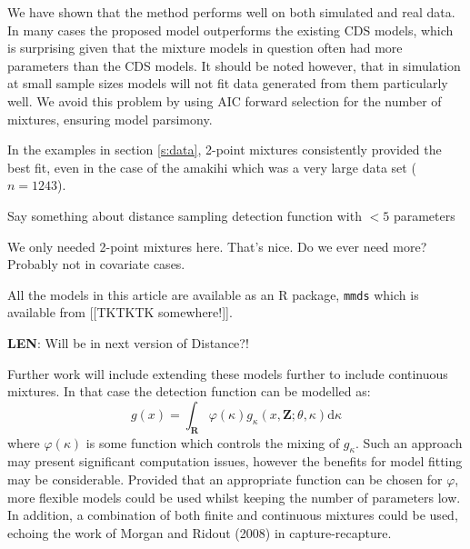 \documentclass[useAMS,referee, usegraphicx]{biom}
\begin{document}
We have shown that the method performs well on both simulated and real data. In many cases the proposed model outperforms the existing CDS models, which is surprising given that the mixture models in question often had more parameters than the CDS models. It should be noted however, that in simulation at small sample sizes models will not fit data generated from them particularly well. We avoid this problem by using AIC forward selection for the number of mixtures, ensuring model parsimony.

In the examples in section \ref{s:data}, 2-point mixtures consistently provided the best fit, even in the case of the amakihi which was a very large data set ($n=1243$). 

Say something about distance sampling detection function with $<5$ parameters


We only needed 2-point mixtures here. That's nice. Do we ever need more? Probably not in covariate cases.

All the models in this article are available as an \textsf{R} package, \texttt{mmds} which is available from [[TKTKTK somewhere!]].

\textbf{LEN}: Will be in next version of Distance?!

Further work will include extending these models further to include continuous mixtures. In that case the detection function can be modelled as:
\begin{equation*}
g(x) = \int_\mathbf{R} \varphi(\kappa) g_\kappa(x,\mathbf{Z}; \theta, \kappa) \text{d}\kappa
\end{equation*}
where $\varphi(\kappa)$ is some function which controls the mixing of $g_\kappa$. Such an approach may present significant computation issues, however the benefits for model fitting may be considerable. Provided that an appropriate function can be chosen for $\varphi$, more flexible models could be used whilst keeping the number of parameters low. In addition, a combination of both finite and continuous mixtures could be used, echoing the work of Morgan and Ridout (2008) in capture-recapture.




\backmatter
\end{document}
